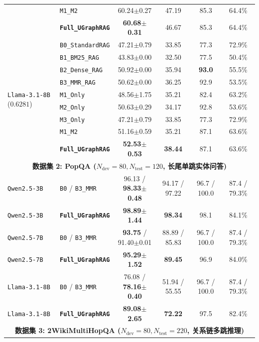 \documentclass[11pt]{article}
\begin{document}
\begin{table}[t]
{{\begin{tabular}{llcccc}
& \texttt{M1\_M2} & 60.24$\pm$0.27 & 47.19 & 85.3 & 64.4\% \\
& \textbf{\texttt{Full\_UGraphRAG}} & \textbf{60.68$\pm$0.31} & 46.67 & 85.3 & 64.4\% \\
\midrule
\multirow{9}{*}{\texttt{Llama-3.1-8B} ($0.6281$)}
& \texttt{B0\_StandardRAG} & 47.21$\pm$0.79 & 33.85 & 77.3 & 72.9\% \\
& \texttt{B1\_BM25\_RAG} & 43.83$\pm$0.00 & 32.50 & 77.5 & 50.4\% \\
& \texttt{B2\_Dense\_RAG} & 50.92$\pm$0.00 & 35.94 & \textbf{93.0} & 55.5\% \\
& \texttt{B3\_MMR\_RAG} & 50.62$\pm$0.00 & 36.25 & 92.9 & 53.5\% \\
& \texttt{M1\_Only} & 48.56$\pm$1.75 & 35.21 & 82.4 & 63.2\% \\
& \texttt{M2\_Only} & 50.63$\pm$0.29 & 34.17 & 92.8 & 53.6\% \\
& \texttt{M3\_Only} & 47.21$\pm$0.79 & 33.85 & 77.3 & 72.9\% \\
& \texttt{M1\_M2} & 51.16$\pm$0.59 & 35.21 & 87.1 & 63.6\% \\
& \textbf{\texttt{Full\_UGraphRAG}} & \textbf{52.53$\pm$0.53} & \textbf{38.44} & 87.1 & 63.6\% \\
\midrule
\multicolumn{6}{c}{\textbf{数据集 2: PopQA ($N_{\text{dev}}=80, N_{\text{test}}=120$, 长尾单跳实体问答)}} \\
\midrule
\texttt{Qwen2.5-3B} & \texttt{B0} / \texttt{B3\_MMR} & 96.13 / \textbf{98.33$\pm$0.48} & 94.17 / 97.22 & 96.7 / 100.0 & 87.4 / 79.3\% \\
\texttt{Qwen2.5-3B} & \textbf{\texttt{Full\_UGraphRAG}} & \textbf{98.89$\pm$1.44} & \textbf{98.34} & 98.1 & 84.1\% \\
\texttt{Qwen2.5-7B} & \texttt{B0} / \texttt{B3\_MMR} & \textbf{93.75} / 91.40$\pm$0.01 & 88.89 / 85.83 & 96.7 / 100.0 & 87.4 / 79.3\% \\
\texttt{Qwen2.5-7B} & \textbf{\texttt{Full\_UGraphRAG}} & \textbf{95.29$\pm$1.52} & \textbf{89.45} & 96.9 & 84.0\% \\
\texttt{Llama-3.1-8B} & \texttt{B0} / \texttt{B3\_MMR} & 76.08 / \textbf{78.16$\pm$0.40} & 51.94 / 55.55 & 96.7 / 100.0 & 87.4 / 79.3\% \\
\texttt{Llama-3.1-8B} & \textbf{\texttt{Full\_UGraphRAG}} & \textbf{89.08$\pm$2.65} & \textbf{72.22} & 97.5 & 82.4\% \\
\midrule
\multicolumn{6}{c}{\textbf{数据集 3: 2WikiMultiHopQA ($N_{\text{dev}}=80, N_{\text{test}}=220$, 关系链多跳推理)}} \\

\end{tabular}}}
\end{table}
\end{document}
